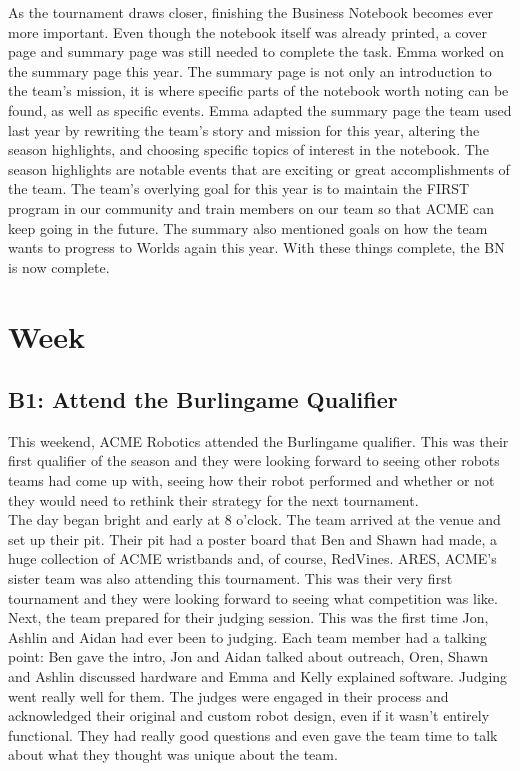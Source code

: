\documentclass{article}
\begin{document}
As the tournament draws closer, finishing the Business Notebook becomes ever more important. Even though the notebook itself was already printed, a cover page and summary page was still needed to complete the task. Emma worked on the summary page this year. The summary page is not only an introduction to the team's mission, it is where specific parts of the notebook worth noting can be found, as well as specific events. Emma adapted the summary page the team used last year by rewriting the team's story and mission for this year, altering the season highlights, and choosing specific topics of interest in the notebook. The season highlights are notable events that are exciting or great accomplishments of the team. The team's overlying goal for this year is to maintain the FIRST program in our community and train members on our team so that ACME can keep going in the future. The summary also mentioned goals on how the team wants to progress to Worlds again this year. With these things complete, the BN is now complete.  


\clearpage \newpage \section{Week \thesection} 
\subsection{B1: Attend the Burlingame Qualifier}

This weekend, ACME Robotics attended the Burlingame qualifier. This was their first qualifier of the season and they were looking forward to seeing other robots teams had come up with, seeing how their robot performed and whether or not they would need to rethink their strategy for the next tournament.\\

The day began bright and early at 8 o'clock. The team arrived at the venue and set up their pit. Their pit had a poster board that Ben and Shawn had made, a huge collection of ACME wristbands and, of course, RedVines. ARES, ACME's sister team was also attending this tournament. This was their very first tournament and they were looking forward to seeing what competition was like. \\

Next, the team prepared for their judging session. This was the first time Jon, Ashlin and Aidan had ever been to judging. Each team member had a talking point: Ben gave the intro, Jon and Aidan talked about outreach, Oren, Shawn and Ashlin discussed hardware and Emma and Kelly explained software. Judging went really well for them. The judges were engaged in their process and acknowledged their original and custom robot design, even if it wasn't entirely functional. They had really good questions and even gave the team time to talk about what they thought was unique about the team. \\
\end{document}
